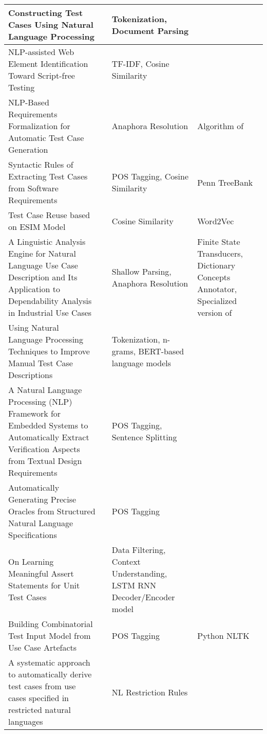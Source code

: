 \begin{longtable}{|p{4cm}|p{4cm}|p{4cm}|p{4cm}|}
            \hline Constructing Test Cases Using Natural Language Processing  & \cite{7972390} &  Tokenization, Document Parsing & \\
            \hline NLP-assisted Web Element Identification Toward Script-free Testing & \cite{9609160} & TF-IDF, Cosine Similarity & \\
            \hline NLP-Based Requirements Formalization for Automatic Test Case Generation & \cite{inproceedings} & Anaphora Resolution & Algorithm of \cite{10.5555/203987.203989}\\
            \hline Syntactic Rules of Extracting Test Cases from Software Requirements  & \cite{masuda2016syntactic} & POS Tagging, Cosine Similarity & Penn TreeBank\\
            \hline Test Case Reuse based on ESIM Model  & \cite{chen2021test} & Cosine Similarity & Word2Vec\\
            \hline A Linguistic Analysis Engine for Natural Language Use Case Description and Its Application to Dependability Analysis in Industrial Use Cases
              & \cite{sinha2009linguistic} & Shallow Parsing, Anaphora Resolution & Finite State Transducers, Dictionary Concepts Annotator, Specialized version of \cite{kennedy1996anaphora}\\
            \hline Using Natural Language Processing Techniques to Improve Manual Test Case Descriptions & \cite{viggiato2022using} & Tokenization, n-grams, BERT-based language models & \\
            \hline A Natural Language Processing (NLP) Framework for Embedded Systems to Automatically Extract Verification Aspects from Textual Design Requirements
            & \cite{anwar2020natural} & POS Tagging, Sentence Splitting & \\
            \hline Automatically Generating Precise Oracles from Structured Natural Language Specifications & \cite{8812070} & POS Tagging & \\
            \hline On Learning Meaningful Assert Statements for Unit Test Cases & \cite{9283916} & Data Filtering, Context Understanding, LSTM RNN Decoder/Encoder model & \\
            \hline Building Combinatorial Test Input Model from Use Case Artefacts & \cite{preeti2017building} &  POS Tagging & Python NLTK\\
            \hline A systematic approach to automatically derive test cases from use cases specified in restricted natural languages   & \cite{zhang2014systematic} & NL Restriction Rules & \\

\end{longtable}
